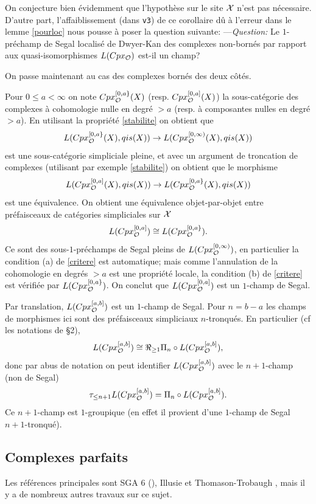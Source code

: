 \documentclass[12pt]{article}
\newcommand{\subnumero}[1]{\subsection*{#1}\phantomsection\addcontentsline{toc}{subsection}{#1}}
\newcommand{\Oo}{{\cal O}}
\newcommand{\Xx}{{\cal X}}
\begin{document}
On conjecture bien \'evidemment que l'hypoth\`ese sur le site $\Xx$ 
n'est pas
n\'ecessaire. D'autre part, l'affaiblissement (dans {\tt v3}) de ce corollaire 
d\^u \`a l'erreur
dans le lemme \ref{pourloc} nous pousse \`a poser la question suivante:
\newline
---{\em Question:} Le $1$-pr\'echamp de Segal 
localis\'e de Dwyer-Kan des complexes non-born\'es par rapport aux
quasi-isomorphismes $L(Cpx_{\Oo})$ est-il un champ? 


On passe maintenant au cas des complexes born\'es
des deux c\^ot\'es.

Pour $0\leq a < \infty$ on note
$Cpx_{\Oo}^{[0, a\} }(X)$ (resp. $Cpx_{\Oo}^{[0, a]}(X)$)
la sous-cat\'egorie des complexes \`a cohomologie nulle
en degr\'e $>a$ (resp. \`a
composantes nulles en degr\'e $>a$). En utilisant la propri\'et\'e
\ref{stabilite} on obtient que
$$
L(Cpx_{\Oo}^{[0, a\} }(X), qis(X))\rightarrow
L(Cpx_{\Oo}^{[0, \infty )}(X), qis(X))
$$
est une sous-cat\'egorie simpliciale pleine, et avec un argument de troncation
de complexes (utilisant par exemple \ref{stabilite}) on obtient que le
morphisme
$$
L(Cpx_{\Oo}^{[0, a] }(X), qis(X))\rightarrow
L(Cpx_{\Oo}^{[0, a\} }(X), qis(X))
$$
est une \'equivalence. On obtient une \'equivalence objet-par-objet
entre pr\'efaisceaux de cat\'egories simpliciales sur $\Xx$
$$
L(Cpx_{\Oo}^{[0, a] })\cong
L(Cpx_{\Oo}^{[0, a\} }).
$$
Ce sont des sous-$1$-pr\'echamps de Segal pleins de
$L(Cpx_{\Oo}^{[0, \infty )})$, en particulier
la condition (a) de \ref{critere} est
automatique; mais comme l'annulation de la cohomologie en
degr\'es  $>a$ est
une propri\'et\'e locale, la condition (b) de \ref{critere} est v\'erifi\'ee par
$L(Cpx_{\Oo}^{[0, a\} })$. On conclut que
$L(Cpx_{\Oo}^{[0, a] })$ est un $1$-champ de Segal.

Par translation, $L(Cpx _{\Oo}^{[a,b]})$ est un $1$-champ de Segal. Pour
$n=b-a$ les champs de morphismes ici sont des pr\'efaisceaux simpliciaux
$n$-tronqu\'es. En particulier (cf les notations de \S 2),
$$
L(Cpx _{\Oo}^{[a,b]})\cong \Re _{\geq 1}
\Pi _n \circ L(Cpx _{\Oo}^{[a,b]}),
$$
donc par abus de notation on peut identifier $L(Cpx _{\Oo}^{[a,b]})$
avec le $n+1$-champ (non de Segal)
$$
\tau _{\leq n+1}L(Cpx _{\Oo}^{[a,b]})=\Pi _n \circ L(Cpx _{\Oo}^{[a,b]}).
$$
Ce $n+1$-champ est $1$-groupique (en effet il provient d'une $1$-champ de
Segal $n+1$-tronqu\'e).


\subnumero{Complexes parfaits}

Les r\'ef\'erences principales sont SGA 6 (\cite{SGA6}), Illusie \cite{Illusie} et
Thomason-Trobaugh \cite{ThomasonTrobaugh}, mais il y a de nombreux autres
travaux sur ce sujet.
\end{document}
